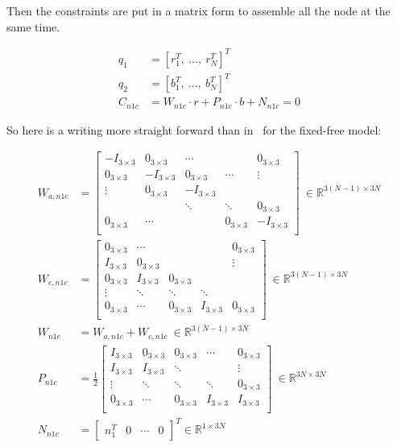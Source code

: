 \documentclass[twoside,12pt]{report} %
\begin{document}
Then the constraints are put in a matrix form to assemble all the node at the same time.

\begin{align}
q_1 &= [ r_1^T,~ ..., ~ r_N^T ]^T \nonumber \\
q_2 &= [ b_1^T,~ ..., ~ b_N^T ]^T \nonumber \\
C_{n1c} &= W_{n1c} \cdot r + P_{n1c}\cdot b + N_{n1c} = 0
\end{align}

So here is a writing more straight forward than in~\cite{johansen2007modelling} for the fixed-free model:


\begin{align}
W_{a,n1c} &= \begin{bmatrix}
    -I_{3\times3} & 0_{3\times3}&  \cdots & & 0_{3\times3} \\
    0_{3\times3}&  -I_{3\times3} & 0_{3\times3}& \cdots & \vdots \\
    \vdots & 0_{3\times3} & -I_{3\times3} & & \\
     &  & \ddots & \ddots & 0_{3\times3} \\
    0_{3\times3} &\cdots & & 0_{3\times3} & -I_{3\times3} \\
\end{bmatrix}~ \in \mathbb{R}^{3(N-1)\times3N} \\
W_{c,n1c} &=\begin{bmatrix}
    0_{3\times3} &   \cdots & & & 0_{3\times3} \\
    I_{3\times3}&  0_{3\times3} &  & & \vdots \\
    0_{3\times3} & I_{3\times3} & 0_{3\times3} &  &  \\
    \vdots & \ddots & \ddots & \ddots & \\
    0_{3\times3} &\cdots & 0_{3\times3} & I_{3\times3} & 0_{3\times3}\\
\end{bmatrix} ~ \in \mathbb{R}^{3(N-1)\times3N} \\
W_{n1c} &=W_{a,n1c} + W_{c,n1c} ~ \in \mathbb{R}^{3(N-1)\times3N} \\
P_{n1c} &= \frac{1}{2} \begin{bmatrix}
    I_{3\times3} & 0_{3\times3}& 0_{3\times3}& \cdots & 0_{3\times3} \\
    I_{3\times3}&  I_{3\times3} & \ddots &  & \vdots \\
    \vdots & \ddots & \ddots & \ddots & 0_{3\times3} \\
    0_{3\times3} &\cdots & 0_{3\times3} & I_{3\times3} & I_{3\times3}\\
\end{bmatrix}~ \in \mathbb{R}^{3N\times3N} \\
N_{n1c} &= \begin{bmatrix} n_1^T & 0 & \cdots & 0 \end{bmatrix}^T \in \mathbb{R}^{1\times3N}
\end{align}
\end{document}
